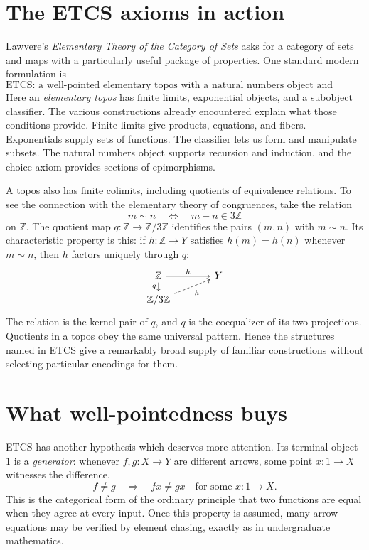 \section{The ETCS axioms in action}

Lawvere's \emph{Elementary Theory of the Category of Sets} asks for a category of sets and maps with a particularly useful package of properties. One standard modern formulation is
\[
 \boxed{\text{ETCS: a well-pointed elementary topos
              with a natural numbers object and choice.}}
\]
Here an \emph{elementary topos} has finite limits, exponential objects, and a subobject classifier. The various constructions already encountered explain what those conditions provide. Finite limits give products, equations, and fibers. Exponentials supply sets of functions. The classifier lets us form and manipulate subsets. The natural numbers object supports recursion and induction, and the choice axiom provides sections of epimorphisms.

A topos also has finite colimits, including quotients of equivalence relations. To see the connection with the elementary theory of congruences, take the relation
\[
 m\sim n \quad\Longleftrightarrow\quad m-n\in3\mathbb Z
\]
on $\mathbb Z$. The quotient map $q:\mathbb Z\to\mathbb Z/3\mathbb Z$ identifies the pairs $(m,n)$ with $m\sim n$. Its characteristic property is this: if $h:\mathbb Z\to Y$ satisfies $h(m)=h(n)$ whenever $m\sim n$, then $h$ factors uniquely through $q$:
\[
 \begin{tikzcd}[column sep=large,row sep=small]
 \mathbb Z\arrow[r,"h"]\arrow[d,"q"']&Y\\
 \mathbb Z/3\mathbb Z\arrow[ur,dashed,"\bar h"']&
 \end{tikzcd}
\]
The relation is the kernel pair of $q$, and $q$ is the coequalizer of its two projections. Quotients in a topos obey the same universal pattern. Hence the structures named in ETCS give a remarkably broad supply of familiar constructions without selecting particular encodings for them.

\section{What well-pointedness buys}

ETCS has another hypothesis which deserves more attention. Its terminal object $1$ is a \emph{generator}: whenever $f,g:X\to Y$ are different arrows, some point $x:1\to X$ witnesses the difference,
\[
 f\ne g\quad\Longrightarrow\quad fx\ne gx
 \quad\text{for some }x:1\to X.
\]
This is the categorical form of the ordinary principle that two functions are equal when they agree at every input. Once this property is assumed, many arrow equations may be verified by element chasing, exactly as in undergraduate mathematics.

